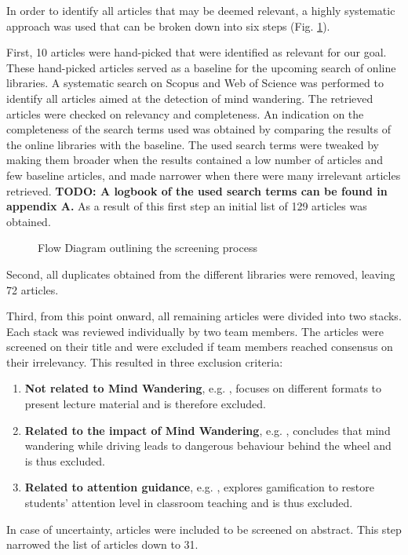 
In order to identify all articles that may be deemed relevant, a highly systematic approach was used that can be broken down into six steps (Fig. \ref{fig:prisma}).

First, 10 articles were hand-picked that were identified as relevant for our goal. These hand-picked articles served as a baseline for the upcoming search of online libraries.
A systematic search on Scopus and Web of Science was performed to identify all articles aimed at the detection of mind wandering. The retrieved articles were checked on relevancy and completeness.
An indication on the completeness of the search terms used was obtained by comparing the results of the online libraries with the baseline. 
The used search terms were tweaked by making them broader when the results contained a low number of articles and few baseline articles, and made narrower when there were many irrelevant articles retrieved.
\textbf{TODO: A logbook of the used search terms can be found in appendix A.}
As a result of this first step an initial list of 129 articles was obtained.

\begin{figure}
  \resizebox{\columnwidth}{!}{}
\caption{Flow Diagram outlining the screening process}
\label{fig:prisma}
\end{figure}

Second, all duplicates obtained from the different libraries were removed, leaving 72 articles.

Third, from this point onward, all remaining articles were divided into two stacks. Each stack was reviewed individually by two team members.
The articles were screened on their title and were excluded if team members reached consensus on their irrelevancy. 
This resulted in three exclusion criteria:
\begin{enumerate}
    \item \textbf{Not related to Mind Wandering}, e.g. \cite{ISI:000432512400017}, focuses on different formats to present lecture material and is therefore excluded.
    \item \textbf{Related to the impact of Mind Wandering}, e.g. \cite{Albert2018LinkingDrivers}, concludes that mind wandering while driving leads to dangerous behaviour behind the wheel and is thus excluded.
    \item \textbf{Related to attention guidance}, e.g. \cite{Xiao2018ClassroomMechanism}, explores gamification to restore students' attention level in classroom teaching and is thus excluded.
  \end{enumerate}
In case of uncertainty, articles were included to be screened on abstract. This step narrowed the list of articles down to 31.


